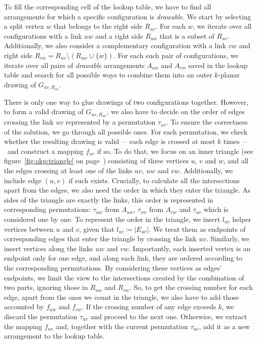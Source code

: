 To fill the corresponding cell of the lookup table, we have to find all arrangements for which a specific configuration is \emph{drawable}. We start by selecting a split vertex \(w\) that belongs to the right side \(R_{uv}\). For each \(w\), we iterate over all configurations with a link \(uw\) and a right side \(R_{uw}\) that is a subset of \(R_{uv}\). Additionally, we also consider a complementary configuration with a link \(vw\) and right side \(R_{vw} = R_{uv} \setminus (R_{uw} \cup \{w\})\). For each such pair of configurations, we iterate over all pairs of \emph{drawable} arrangements \(A_{uw}\) and \(A_{vw}\) saved in the lookup table and search for all possible ways to combine them into an outer \(k\)-planar drawing of \(G_{uv, R_{uv}}\).

There is only one way to glue drawings of two configurations together. However, to form a valid drawing of \(G_{uv, R_{uv}}\), we also have to decide on the order of edges crossing the link \(uv\) represented by a permutation \(\tau_{uv}\). To ensure the correctness of the solution, we go through all possible ones. For each permutation, we check whether the resulting drawing is valid~--~each edge is crossed at most \(k\) times~--~and construct a mapping \(f_{uv}\) if so. To do that, we focus on an inner triangle (see figure~\ref{fig:okp:triangle} on page~\pageref{fig:okp:triangle}) consisting of three vertices \(u\), \(v\) and \(w\), and all the edges crossing at least one of the links \(uv\), \(uw\) and \(vw\). Additionally, we include edge \((u, v)\) if such exists. Crucially, to calculate all the intersections apart from the edges, we also need the order in which they enter the triangle. As sides of the triangle are exactly the links, this order is represented in corresponding permutations: \(\tau_{uw}\) from \(A_{uw}\), \(\tau_{vw}\) from \(A_{vw}\) and \(\tau_{uv}\) which is considered one by one. To represent the order in the triangle, we insert \(l_{uv}\) helper vertices between \(u\) and \(v\), given that \(l_{uv}\coloneq|E_{uv}|\). We treat them as endpoints of corresponding edges that enter the triangle by crossing the link \(uv\). Similarly, we insert vertices along the links \(uw\) and \(vw\). Importantly, each inserted vertex is an endpoint only for one edge, and along each link, they are ordered according to the corresponding permutations. By considering these vertices as edges' endpoints, we limit the view to the intersections created by the combination of two parts, ignoring those in \(R_{uw}\) and \(R_{vw}\). So, to get the crossing number for each edge, apart from the ones we count in the triangle, we also have to add those accounted by \(f_{uw}\) and \(f_{vw}\). If the crossing number of any edge exceeds \(k\), we discard the permutation \(\tau_{uv}\) and proceed to the next one. Otherwise, we extract the mapping \(f_{uv}\) and, together with the current permutation \(\tau_{uv}\), add it as a new arrangement to the lookup table.

